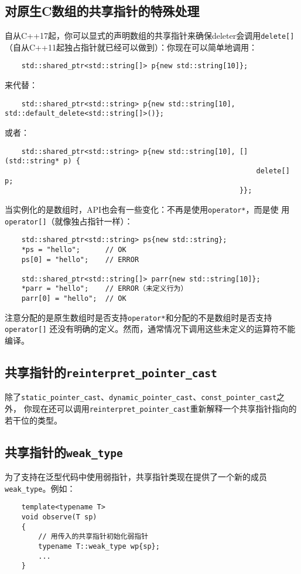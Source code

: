 \subsection{对原生C数组的共享指针的特殊处理}\label{ch28.2.1}
自从C++17起，你可以显式的声明数组的共享指针来确保deleter会调用\texttt{delete[]}
（自从C++11起独占指针就已经可以做到）：你现在可以简单地调用：
\begin{lstlisting}
    std::shared_ptr<std::string[]> p{new std::string[10]};
\end{lstlisting}
来代替：
\begin{lstlisting}
    std::shared_ptr<std::string> p{new std::string[10], std::default_delete<std::string[]>()};
\end{lstlisting}
或者：
\begin{lstlisting}
    std::shared_ptr<std::string> p{new std::string[10], [](std::string* p) {
                                                            delete[] p;
                                                        }};
\end{lstlisting}
当实例化的是数组时，API也会有一些变化：不再是使用\texttt{operator*}，而是使
用\texttt{operator[]}（就像独占指针一样）：
\begin{lstlisting}
    std::shared_ptr<std::string> ps{new std::string};
    *ps = "hello";      // OK
    ps[0] = "hello";    // ERROR

    std::shared_ptr<std::string[]> parr{new std::string[10]};
    *parr = "hello";    // ERROR（未定义行为）
    parr[0] = "hello";  // OK
\end{lstlisting}
注意分配的是原生数组时是否支持\texttt{operator*}和分配的不是数组时是否支持\texttt{operator[]}
还没有明确的定义。然而，通常情况下调用这些未定义的运算符不能编译。

\subsection{共享指针的\texttt{reinterpret\_pointer\_cast}}
除了\texttt{static\_pointer\_cast}、\texttt{dynamic\_pointer\_cast}、\texttt{const\_pointer\_cast}之外，
你现在还可以调用\texttt{reinterpret\_pointer\_cast}重新解释一个共享指针指向的若干位的类型。

\subsection{共享指针的\texttt{weak\_type}}
为了支持在泛型代码中使用弱指针，共享指针类现在提供了一个新的成员\texttt{weak\_type}。例如：
\begin{lstlisting}
    template<typename T>
    void observe(T sp)
    {
        // 用传入的共享指针初始化弱指针
        typename T::weak_type wp{sp};
        ...
    }
\end{lstlisting}

